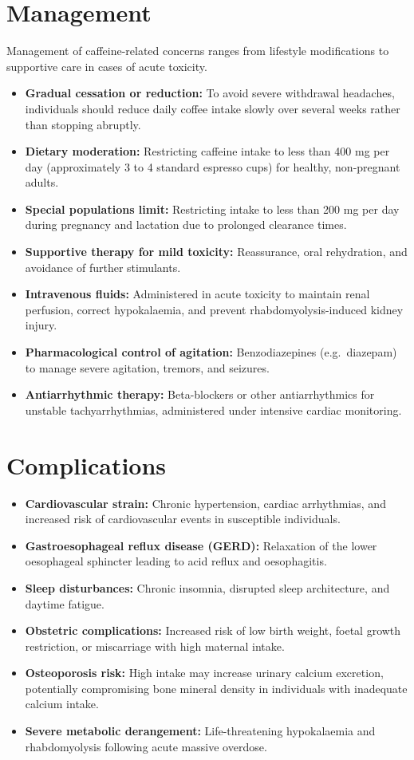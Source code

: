 \section*{Management}
Management of caffeine-related concerns ranges from lifestyle modifications to supportive care in cases of acute toxicity.
\begin{itemize}
    \item \textbf{Gradual cessation or reduction:} To avoid severe withdrawal headaches, individuals should reduce daily coffee intake slowly over several weeks rather than stopping abruptly.
    \item \textbf{Dietary moderation:} Restricting caffeine intake to less than 400 mg per day (approximately 3 to 4 standard espresso cups) for healthy, non-pregnant adults.
    \item \textbf{Special populations limit:} Restricting intake to less than 200 mg per day during pregnancy and lactation due to prolonged clearance times.
    \item \textbf{Supportive therapy for mild toxicity:} Reassurance, oral rehydration, and avoidance of further stimulants.
    \item \textbf{Intravenous fluids:} Administered in acute toxicity to maintain renal perfusion, correct hypokalaemia, and prevent rhabdomyolysis-induced kidney injury.
    \item \textbf{Pharmacological control of agitation:} Benzodiazepines (e.g.\ diazepam) to manage severe agitation, tremors, and seizures.
    \item \textbf{Antiarrhythmic therapy:} Beta-blockers or other antiarrhythmics for unstable tachyarrhythmias, administered under intensive cardiac monitoring.
\end{itemize}

\section*{Complications}
\begin{itemize}
    \item \textbf{Cardiovascular strain:} Chronic hypertension, cardiac arrhythmias, and increased risk of cardiovascular events in susceptible individuals.
    \item \textbf{Gastroesophageal reflux disease (GERD):} Relaxation of the lower oesophageal sphincter leading to acid reflux and oesophagitis.
    \item \textbf{Sleep disturbances:} Chronic insomnia, disrupted sleep architecture, and daytime fatigue.
    \item \textbf{Obstetric complications:} Increased risk of low birth weight, foetal growth restriction, or miscarriage with high maternal intake.
    \item \textbf{Osteoporosis risk:} High intake may increase urinary calcium excretion, potentially compromising bone mineral density in individuals with inadequate calcium intake.
    \item \textbf{Severe metabolic derangement:} Life-threatening hypokalaemia and rhabdomyolysis following acute massive overdose.
\end{itemize}

